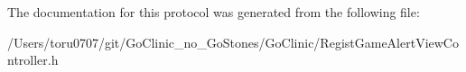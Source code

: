 The documentation for this protocol was generated from the following file:\begin{DoxyCompactItemize}
\item 
/Users/toru0707/git/GoClinic\_\-no\_\-GoStones/GoClinic/RegistGameAlertViewController.h\end{DoxyCompactItemize}
